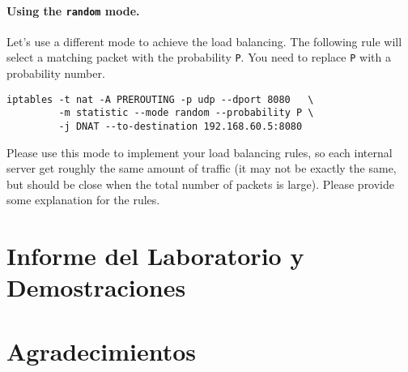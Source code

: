 \paragraph{Using the \texttt{random} mode.}
Let's use a different mode to achieve the load balancing. The following 
rule will select a matching packet with the probability \texttt{P}.  
You need to replace \texttt{P} with a probability number.

\begin{lstlisting}
iptables -t nat -A PREROUTING -p udp --dport 8080   \
         -m statistic --mode random --probability P \
         -j DNAT --to-destination 192.168.60.5:8080
\end{lstlisting}

Please use this mode to implement your load balancing 
rules, so each internal server get roughly the 
same amount of traffic (it may not be exactly the same, 
but should be close when the total number of packets is large). 
Please provide some explanation for the rules. 




\section{Informe del Laboratorio y Demostraciones}




\section*{Agradecimientos}








